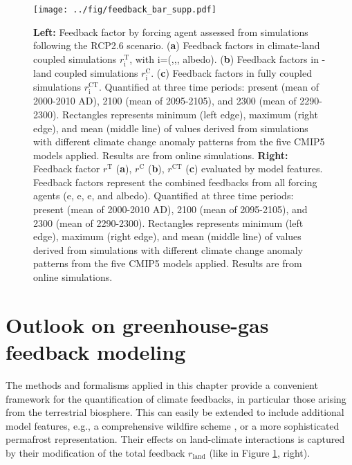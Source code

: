 \begin{figure}[ht!]
\begin{center}
\texttt{[image: ../fig/feedback\_bar\_supp.pdf]}
\end{center}
\caption[Feedback factors derived from a RCP2.6 simulation and an RCP8.5 simulation, given for model setups excluding different features]{{\bf Left:} Feedback factor by forcing agent assessed from simulations following the RCP2.6 scenario. ({\bf a}) Feedback factors in climate-land coupled simulations $r^{\text{T}}_{\text{i}}$, with i=(\coo ,\nno ,\chh , albedo). ({\bf b}) Feedback factors in \coo -land coupled simulations $r^{\text{C}}_{\text{i}}$.  ({\bf c}) Feedback factors in fully coupled simulations $r^{\text{CT}}_{\text{i}}$. Quantified at three time periods: present (mean of 2000-2010 AD), 2100 (mean of 2095-2105), and 2300 (mean of 2290-2300). Rectangles represents minimum (left edge), maximum (right edge), and mean (middle line) of values derived from simulations with different climate change anomaly patterns from the five CMIP5 models applied. Results are from online simulations. {\bf Right:} Feedback factor $r^{\mathrm{T}}$ ({\bf a}), $r^{\mathrm{C}}$ ({\bf b}), $r^{\mathrm{CT}}$ ({\bf c}) evaluated by model features. Feedback factors represent the combined feedbacks from all forcing agents (e\coo , e\nno , e\chh , and albedo). Quantified at three time periods: present (mean of 2000-2010 AD), 2100 (mean of 2095-2105), and 2300 (mean of 2290-2300). Rectangles represents minimum (left edge), maximum (right edge), and mean (middle line) of values derived from simulations with different climate change anomaly patterns from the five CMIP5 models applied. Results are from online simulations.}
\label{fig:feedbacks.supp}
\end{figure}

\clearpage

\section{Outlook on greenhouse-gas feedback modeling}
\label{sec:outlook.multighg}
The methods and formalisms applied in this chapter provide a convenient framework for the quantification of climate feedbacks, in particular those arising from the terrestrial biosphere. This can easily be extended to include additional model features, e.g., a comprehensive wildfire scheme \citep{prentice11gbc}, or a more sophisticated permafrost representation. Their effects on land-climate interactions is captured by their modification of the total feedback $r_{\text{land}}$ (like in Figure \ref{fig:feedbacks.supp}, right).\\
 
